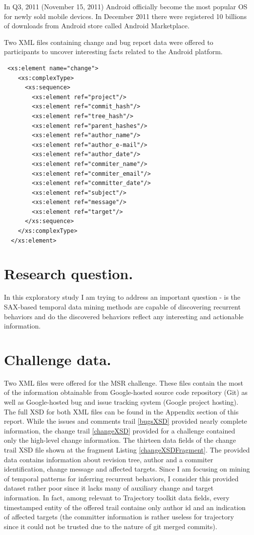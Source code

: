 \documentclass[a4paper,10pt]{article}
\numberwithin{equation}{subsection}
\begin{document}
In Q3, 2011 (November 15, 2011) Android officially become the most popular OS for newly sold mobile 
devices. In December 2011 there were registered 10 billions of downloads from Android store called
Android Marketplace. 

Two XML files containing change and bug report 
data were offered to participants to uncover interesting facts related to the Android platform.

\lstset{label=changeXSDFragment,caption=List of metadata provided by change trail XML (fragment) }
\begin{lstlisting}
 <xs:element name="change">
    <xs:complexType>
      <xs:sequence>
        <xs:element ref="project"/>
        <xs:element ref="commit_hash"/>
        <xs:element ref="tree_hash"/>
        <xs:element ref="parent_hashes"/>
        <xs:element ref="author_name"/>
        <xs:element ref="author_e-mail"/>
        <xs:element ref="author_date"/>
        <xs:element ref="commiter_name"/>
        <xs:element ref="commiter_email"/>
        <xs:element ref="committer_date"/>
        <xs:element ref="subject"/>
        <xs:element ref="message"/>
        <xs:element ref="target"/>
      </xs:sequence>
    </xs:complexType>
  </xs:element>
\end{lstlisting}

\section{Research question.}
In this exploratory study I am trying to address an important question - is the SAX-based temporal data
mining methods are capable of discovering recurrent behaviors and do the discovered behaviors reflect 
any interesting and actionable information.

\section{Challenge data.}
Two XML files were offered for the MSR challenge. These files contain the most of the information
obtainable from Google-hosted source code repository (Git) as well as Google-hosted bug and issue
tracking system (Google project hosting). 
The full XSD for both XML files can be found in the Appendix section of this report.
While the issues and comments trail \ref{bugsXSD} provided nearly complete information,
the change trail \ref{changeXSD} provided for a challenge contained only the high-level change information.
The thirteen data fields of the change trail XSD file shown at the fragment Listing \ref{changeXSDFragment}. 
The provided data contains information about revision tree, author and a commiter identification, change
message and affected targets.
Since I am focusing on mining of temporal patterns for inferring recurrent behaviors, I consider 
this provided dataset rather poor since it lacks many of auxiliary change and target information. 
In fact, among relevant to Trajectory toolkit data fields, every timestamped entity of the offered trail
containe only author id and an indication of affected targets (the committer information
is rather useless for trajectory since it could not be trusted due to the nature of git merged commits).   
\end{document}

